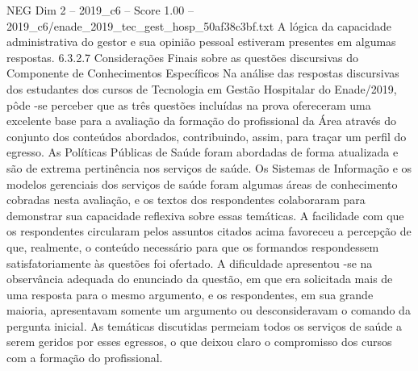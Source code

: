 \begin{textsample}{NEG Dim 2 – 2019\_c6 – Score 1.00 – 2019\_c6/enade\_2019\_tec\_gest\_hosp\_50af38c3bf.txt}
A lógica da capacidade administrativa do gestor e sua opinião pessoal estiveram presentes em algumas respostas. 6.3.2.7 Considerações Finais sobre as questões discursivas do Componente de Conhecimentos Específicos Na análise das respostas discursivas dos estudantes dos cursos de Tecnologia em Gestão Hospitalar do Enade/2019, pôde -se perceber que as três questões incluídas na prova ofereceram uma excelente base para a avaliação da formação do profissional da Área através do conjunto dos conteúdos abordados, contribuindo, assim, para traçar um perfil do egresso.
As Políticas Públicas de Saúde foram abordadas de forma atualizada e são de extrema pertinência nos serviços de saúde.
Os Sistemas de Informação e os modelos gerenciais dos serviços de saúde foram algumas áreas de conhecimento cobradas nesta avaliação, e os textos dos respondentes colaboraram para demonstrar sua capacidade reflexiva sobre essas temáticas.
A facilidade com que os respondentes circularam pelos assuntos citados acima favoreceu a percepção de que, realmente, o conteúdo necessário para que os formandos respondessem satisfatoriamente às questões foi ofertado.
A dificuldade apresentou -se na observância adequada do enunciado da questão, em que era solicitada mais de uma resposta para o mesmo argumento, e os respondentes, em sua grande maioria, apresentavam somente um argumento ou desconsideravam o comando da pergunta inicial.
As temáticas discutidas permeiam todos os serviços de saúde a serem geridos por esses egressos, o que deixou claro o compromisso dos cursos com a formação do profissional.

\end{textsample}
